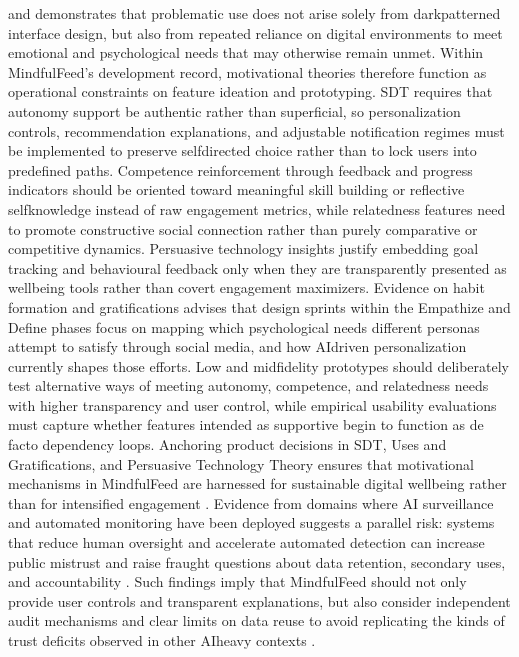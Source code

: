 \documentclass{article}
\begin{document}
and demonstrates that problematic use does not arise solely from dark\-patterned interface design, but also from repeated reliance on digital environments to meet emotional and psychological needs that may otherwise remain unmet. Within MindfulFeed's development record, motivational theories therefore function as operational constraints on feature ideation and prototyping. SDT requires that autonomy support be authentic rather than superficial, so personalization controls, recommendation explanations, and adjustable notification regimes must be implemented to preserve self\-directed choice rather than to lock users into pre\-defined paths. Competence reinforcement through feedback and progress indicators should be oriented toward meaningful skill building or reflective self\-knowledge instead of raw engagement metrics, while relatedness features need to promote constructive social connection rather than purely comparative or competitive dynamics. Persuasive technology insights justify embedding goal tracking and behavioural feedback only when they are transparently presented as well\-being tools rather than covert engagement maximizers. Evidence on habit formation and gratifications advises that design sprints within the Empathize and Define phases focus on mapping which psychological needs different personas attempt to satisfy through social media, and how AI\-driven personalization currently shapes those efforts. Low\- and mid\-fidelity prototypes should deliberately test alternative ways of meeting autonomy, competence, and relatedness needs with higher transparency and user control, while empirical usability evaluations must capture whether features intended as supportive begin to function as de facto dependency loops. Anchoring product decisions in SDT, Uses and Gratifications, and Persuasive Technology Theory ensures that motivational mechanisms in MindfulFeed are harnessed for sustainable digital well\-being rather than for intensified engagement \parencites[8]{2404919}. Evidence from domains where AI surveillance and automated monitoring have been deployed suggests a parallel risk: systems that reduce human oversight and accelerate automated detection can increase public mistrust and raise fraught questions about data retention, secondary uses, and accountability \parencites[2]{7025237}. Such findings imply that MindfulFeed should not only provide user controls and transparent explanations, but also consider independent audit mechanisms and clear limits on data reuse to avoid replicating the kinds of trust deficits observed in other AI\-heavy contexts \parencites[2]{7025237}.
\end{document}
